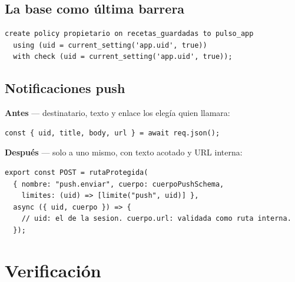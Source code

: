 \documentclass[11pt,letterpaper]{article}
\begin{document}
\subsection*{La base como última barrera}
\noindent\begin{minipage}{\linewidth}
\begin{lstlisting}[style=despues]
create policy propietario on recetas_guardadas to pulso_app
  using (uid = current_setting('app.uid', true))
  with check (uid = current_setting('app.uid', true));
\end{lstlisting}
\end{minipage}\par\vspace{4pt}

\subsection*{Notificaciones push}
\noindent\begin{minipage}{\linewidth}
\noindent\textbf{\color{antes}Antes} — destinatario, texto y enlace los elegía quien llamara:
\begin{lstlisting}[style=antes]
const { uid, title, body, url } = await req.json();
\end{lstlisting}
\end{minipage}\par\vspace{4pt}
\noindent\begin{minipage}{\linewidth}
\noindent\textbf{\color{despues}Después} — solo a uno mismo, con texto acotado y URL interna:
\begin{lstlisting}[style=despues]
export const POST = rutaProtegida(
  { nombre: "push.enviar", cuerpo: cuerpoPushSchema,
    limites: (uid) => [limite("push", uid)] },
  async ({ uid, cuerpo }) => {
    // uid: el de la sesion. cuerpo.url: validada como ruta interna.
  });
\end{lstlisting}
\end{minipage}\par\vspace{4pt}

\section{Verificación}\label{sec:verif}
\end{document}
